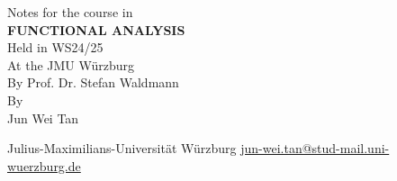 \documentclass[twoside,symmetric, openany, 12pt]{./tuftebook}
\theoremstyle{definition}
\theoremstyle{definition}
\theoremstyle{definition}
\begin{document}
\begin{titlepage}
	{\begingroup%
		\centering
		{\Large Notes for the course in}\\[\baselineskip]
		{\Huge\bfseries FUNCTIONAL ANALYSIS}\\[\baselineskip]
		{\Large Held in WS24/25\\ At the JMU Würzburg\\ By Prof. Dr. Stefan Waldmann}\\[\baselineskip]
		{\LARGE By}\\[\baselineskip]
		{\LARGE Jun Wei Tan}\par
		\vfill
		{Julius-Maximilians-Universit\"{a}t W\"{u}rzburg}
		\vfill
		{\small\sffamily \href{mailto:jun-wei.tan@stud-mail.uni-wuerzburg.de}{jun-wei.tan@stud-mail.uni-wuerzburg.de}}\par
		\endgroup}
\end{titlepage}
\restoregeometry
	\tableofcontents
\end{document}
